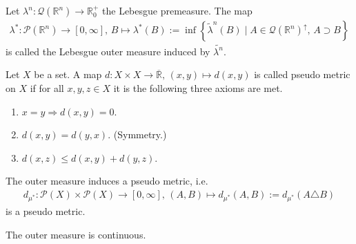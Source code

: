 \begin{proposition}

\end{proposition}

\begin{proposition}

\end{proposition}

\begin{definition}
    Let \(\lambda^n: \mathcal{Q}(\mathbb{R}^n) \rightarrow \mathbb{R}_0^+\) the Lebesgue premeasure. The map
    \begin{align}
        \lambda^*: \mathcal{P}(\mathbb{R}^n) \rightarrow [0, \infty], \, B \mapsto \lambda^*(B):= \inf \left\{ \tilde{\lambda}^n (B) \mid A \in \mathcal{Q}(\mathbb{R}^n)^\uparrow, \, A \supset B \right\}
    \end{align}
    is called the Lebesgue outer measure induced by \(\tilde{\lambda^n}\).
\end{definition}

\begin{definition}
    Let \(X\) be a set. A map \(d: X \times X \rightarrow \overline{\mathbb{R}}, \, (x,y) \mapsto d(x,y)\) is called pseudo metric on \(X\) if for all \(x, y, z \in X\) it is the following three axioms are met.
    \begin{enumerate}
        \item \(x=y \Rightarrow d(x, y) = 0\).
        \item \(d(x, y) = d(y, x)\). (Symmetry.)
        \item \(d(x, z) \leq d(x, y) + d(y, z)\).
    \end{enumerate}
\end{definition}

\begin{proposition}
    The outer measure induces a pseudo metric, i.e.
    \begin{align}
        d_{\mu^*}: \mathcal{P}(X) \times \mathcal{P}(X) \rightarrow [0, \infty], \, (A, B) \mapsto d_{\mu^*}(A, B) := d_{\mu^*}(A \triangle B)
    \end{align}
    is a pseudo metric.
\end{proposition}

\begin{proposition}
    The outer measure is continuous.
\end{proposition}

